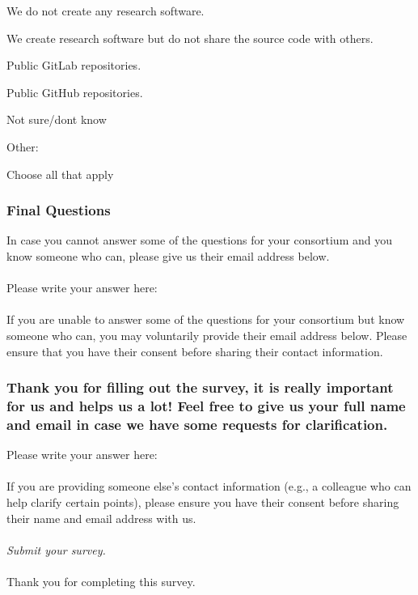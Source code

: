 \documentclass[headsepline,titlepage,twoside,12pt,toc=flat,headings=normal]{scrreprt}
\newcommand{\question}[1]{\subsubsection{#1}}
\newcommand{\otherbox}{\fbox{\phantom{This is how big an answer would be.}}}
\begin{document}
\begin{answers}
\item We do not create any research software.
\item We create research software but do not share the source code with others.
\item Public GitLab repositories.
\item Public GitHub repositories.
\item Not sure/don\textquotesingle t know
\item Other: \otherbox
\end{answers}

Choose all that apply

\question{Final Questions}\label{final-questions}
In case you cannot answer some of the questions for your consortium and you know someone who can, please give us their email address below.

\paragraph{}
Please write your answer here: \otherbox

\paragraph{}
If you are unable to answer some of the questions for your consortium but know someone who can, you may voluntarily provide their email address below.
Please ensure that you have their consent before sharing their contact information.

\question{Thank you for filling out the survey, it is really important for us and helps us a lot! Feel free to give us your full name and email in case we have some requests for clarification.}
Please write your answer here: \otherbox

\paragraph{}
If you are providing someone else's contact information (e.g., a colleague who can help clarify certain points), please ensure you have their consent before sharing their name and email address with us.

\paragraph{}
\emph{Submit your survey.}

\paragraph{}
Thank you for completing this survey.
\end{document}
